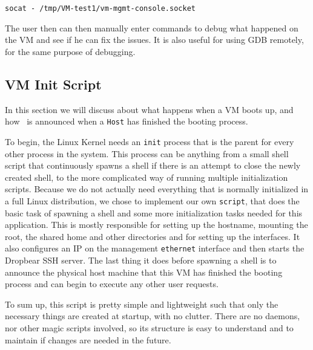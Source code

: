 \lstset{label=lst:socat-serial-example}
\begin{lstlisting}
socat - /tmp/VM-test1/vm-mgmt-console.socket
\end{lstlisting}

The user then can then manually enter commands to debug what happened on the VM and see if he can fix the issues.
It is also useful for using GDB remotely, for the same purpose of debugging.

\subsection{VM Init Script}
\label{sub-sec:vm-init-script}

In this section we will discuss about what happens when a VM boots up, and how \project\ is announced when a \texttt{Host} has finished the booting process.

To begin, the Linux Kernel needs an \texttt{init} process that is the parent for every other process in the system.
This process can be anything from a small shell script that continuously spawns a shell if there is an attempt to close the newly created shell, to the more complicated way of running multiple initialization scripts.
Because we do not actually need everything that is normally initialized in a full Linux distribution, we chose to implement our own \texttt{script}, that does the basic task of spawning a shell and some more initialization tasks needed for this application.
This is mostly responsible for setting up the hostname, mounting the root, the shared home and other directories and for setting up the interfaces.
It also configures an IP on the management \texttt{ethernet} interface and then starts the Dropbear SSH server.
The last thing it does before spawning a shell is to announce the physical host machine that this VM has finished the booting process and can begin to execute any other user requests.

To sum up, this script is pretty simple and lightweight such that only the necessary things are created at startup, with no clutter.
There are no daemons, nor other magic scripts involved, so its structure is easy to understand and to maintain if changes are needed in the future.
